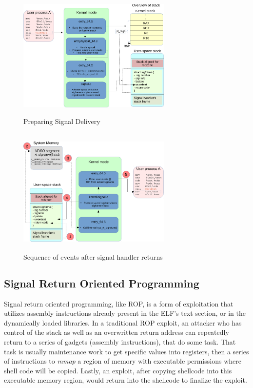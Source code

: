 \documentclass{sig-alternate-05-2015}
\begin{document}
\begin{figure}
\centering
\includegraphics[height=2.5in, width=3in]{3.pdf}
\caption{Preparing Signal Delivery}
\label{fig:sig1}
\end{figure}

\begin{figure}
\centering
\includegraphics[height=2.5in, width=3in]{4.pdf}
\caption{Sequence of events after signal handler returns}
\label{fig:sig2}
\end{figure}

\subsection{Signal Return Oriented Programming}
Signal return oriented programming, like ROP, is a form of exploitation that utilizes assembly instructions already present in the ELF's text section, or in the dynamically loaded libraries. In a traditional ROP exploit, an attacker who has control of the stack as well as an overwritten return address can repeatedly return to a series of gadgets (assembly instructions), that do some task. That task is usually maintenance work to get specific values into registers, then a series of instructions to \textit{mmap} a region of memory with executable permissions where shell code will be copied. Lastly, an exploit, after copying shellcode into this executable memory region, would return into the shellcode to finalize the exploit.
\end{document}
